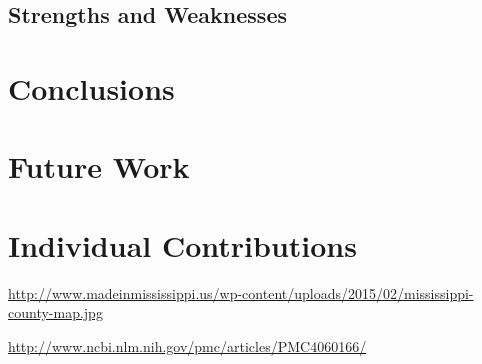 \documentclass[titlepage]{article}
\begin{document}
  \subsection{Strengths and Weaknesses}

\section{Conclusions}
\label{sec:conclusions}

\section{Future Work}
\label{sec:future}

\section{Individual Contributions}
\label{sec:contributions}
  \begin{thebibliography}{9}
      \url{http://www.madeinmississippi.us/wp-content/uploads/2015/02/mississippi-county-map.jpg}

      \url{http://www.ncbi.nlm.nih.gov/pmc/articles/PMC4060166/}

  \end{thebibliography}
\end{document}
